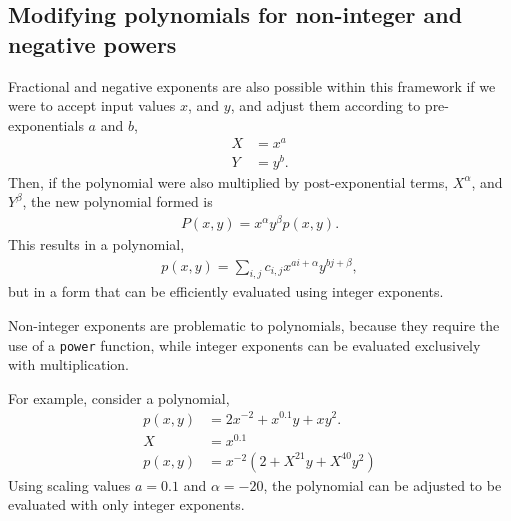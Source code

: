 \subsection{Modifying polynomials for non-integer and negative powers}
Fractional and negative exponents are also possible within this framework if we were to accept input values $x$, and $y$, and adjust them according to pre-exponentials $a$ and $b$,
\begin{align}
X &= x^a\\
Y &= y^b.
\end{align}
Then, if the polynomial were also multiplied by post-exponential terms, $X^\alpha$, and $Y^\beta$, the new polynomial formed is
\begin{align}
P(x,y) = x^\alpha y^\beta p(x,y).
\end{align}
This results in a polynomial,
\begin{align}
p(x,y) = \sum_{i,j} c_{i,j} x^{ai+\alpha} y^{bj+\beta},\label{eqn:general}
\end{align}
but in a form that can be efficiently evaluated using integer exponents.  

Non-integer exponents are problematic to polynomials, because they require the use of a \texttt{power} function, while integer exponents can be evaluated exclusively with multiplication.

For example, consider a polynomial,
\begin{align}
p(x,y) &= 2x^{-2} + x^{0.1}y + xy^2.\nonumber\\
X &= x^{0.1}\nonumber\\
p(x,y) &= x^{-2}\left(2 + X^{21}y + X^{40}y^2 \right)\nonumber
\end{align}
Using scaling values $a = 0.1$ and $\alpha = -20$, the polynomial can be adjusted to be evaluated with only integer exponents.  


